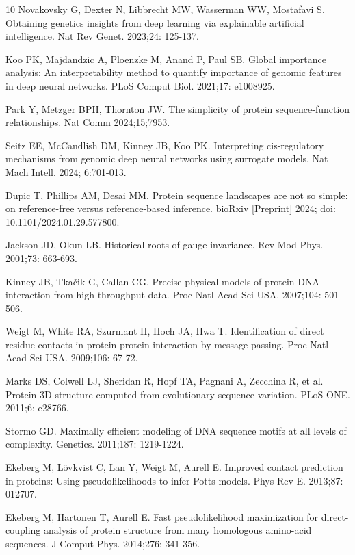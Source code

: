 \documentclass[10pt,letterpaper]{article}
\begin{document}
\begin{thebibliography}{10}
 Novakovsky G, Dexter N, Libbrecht MW, Wasserman WW, Mostafavi S. Obtaining genetics insights from deep learning via explainable artificial intelligence. Nat Rev Genet. 2023;24: 125-137.

 Koo PK, Majdandzic A, Ploenzke M, Anand P, Paul SB. Global importance analysis: An interpretability method to quantify importance of genomic features in deep neural networks. PLoS Comput Biol. 2021;17: e1008925.

 Park Y, Metzger BPH, Thornton JW. The simplicity of protein sequence-function relationships. Nat Comm 2024;15;7953.

 Seitz EE, McCandlish DM, Kinney JB, Koo PK. Interpreting cis-regulatory mechanisms from genomic deep neural networks using surrogate models. Nat Mach Intell. 2024; 6:701-013.

 Dupic T, Phillips AM, Desai MM. Protein sequence landscapes are not so simple: on reference-free versus reference-based inference. bioRxiv [Preprint] 2024; doi: 10.1101/2024.01.29.577800. %

 Jackson JD, Okun LB. Historical roots of gauge invariance. Rev Mod Phys. 2001;73: 663-693.

 Kinney JB, Tka\v{c}ik G, Callan CG. Precise physical models of protein-DNA interaction from high-throughput data. Proc Natl Acad Sci USA. 2007;104: 501-506. 

 Weigt M, White RA, Szurmant H, Hoch JA, Hwa T. Identification of direct residue contacts in protein-protein interaction by message passing. Proc Natl Acad Sci USA. 2009;106: 67-72. 

 Marks DS, Colwell LJ, Sheridan R, Hopf TA, Pagnani A, Zecchina R, et al. Protein 3D structure computed from evolutionary sequence variation. PLoS ONE. 2011;6: e28766. 

 Stormo GD. Maximally efficient modeling of DNA sequence motifs at all levels of complexity. Genetics. 2011;187: 1219-1224.

 Ekeberg M, L\"{o}vkvist C, Lan Y, Weigt M, Aurell E. Improved contact prediction in proteins: Using pseudolikelihoods to infer Potts models. Phys Rev E. 2013;87: 012707. 

 Ekeberg M, Hartonen T, Aurell E. Fast pseudolikelihood maximization for direct-coupling analysis of protein structure from many homologous amino-acid sequences. J Comput Phys. 2014;276: 341-356. 


\end{thebibliography}
\end{document}
